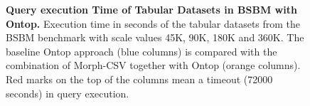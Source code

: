 \begin{figure}[th]
  \centering
  \qquad
\caption[Query execution Time in BSBM with Ontop]{\textbf{Query execution Time of Tabular Datasets in BSBM with Ontop.} Execution time in seconds of the tabular datasets from the BSBM benchmark with scale values 45K, 90K, 180K and 360K. The baseline Ontop approach (blue columns) is compared with the combination of Morph-CSV together with Ontop (orange columns). Red marks on the top of the columns mean a timeout (72000 seconds) in query execution.}
\label{fig:ontopbsbm}
\end{figure}

